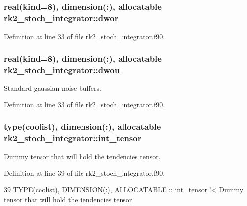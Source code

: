\subsubsection[{\texorpdfstring{dwor}{dwor}}]{\setlength{\rightskip}{0pt plus 5cm}real(kind=8), dimension(\+:), allocatable rk2\+\_\+stoch\+\_\+integrator\+::dwor\hspace{0.3cm}{\ttfamily [private]}}\hypertarget{namespacerk2__stoch__integrator_afd5ed4abd1a2c69b89beb41d2718e702}{}\label{namespacerk2__stoch__integrator_afd5ed4abd1a2c69b89beb41d2718e702}


Definition at line 33 of file rk2\+\_\+stoch\+\_\+integrator.\+f90.

\subsubsection[{\texorpdfstring{dwou}{dwou}}]{\setlength{\rightskip}{0pt plus 5cm}real(kind=8), dimension(\+:), allocatable rk2\+\_\+stoch\+\_\+integrator\+::dwou\hspace{0.3cm}{\ttfamily [private]}}\hypertarget{namespacerk2__stoch__integrator_a8c5c398d4bf895571169d6fd78300df0}{}\label{namespacerk2__stoch__integrator_a8c5c398d4bf895571169d6fd78300df0}


Standard gaussian noise buffers. 



Definition at line 33 of file rk2\+\_\+stoch\+\_\+integrator.\+f90.

\subsubsection[{\texorpdfstring{int\+\_\+tensor}{int_tensor}}]{\setlength{\rightskip}{0pt plus 5cm}type({\bf coolist}), dimension(\+:), allocatable rk2\+\_\+stoch\+\_\+integrator\+::int\+\_\+tensor\hspace{0.3cm}{\ttfamily [private]}}\hypertarget{namespacerk2__stoch__integrator_a0bf74d9bd925f796fa25569ab96997fb}{}\label{namespacerk2__stoch__integrator_a0bf74d9bd925f796fa25569ab96997fb}


Dummy tensor that will hold the tendencies tensor. 



Definition at line 39 of file rk2\+\_\+stoch\+\_\+integrator.\+f90.


\begin{DoxyCode}
39   \textcolor{keywordtype}{TYPE}(\hyperlink{structtensor_1_1coolist}{coolist}), \textcolor{keywordtype}{DIMENSION(:)}, \textcolor{keywordtype}{ALLOCATABLE} :: int\_tensor\textcolor{comment}{ !< Dummy tensor that will hold the
       tendencies tensor}
\end{DoxyCode}
